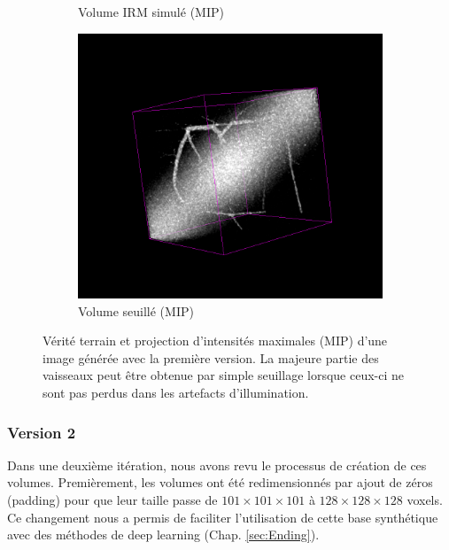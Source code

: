 \begin{figure}[!ht]
\begin{subfigure}{0.45\textwidth}
    \caption{Volume IRM simulé (MIP)}
  \end{subfigure}
  \begin{subfigure}{0.45\textwidth}
    \includegraphics[width=\textwidth]{Images/vascu_v1_thresholding.png}
    \centering
    \caption{Volume seuillé (MIP)}
  \end{subfigure}
  \caption{Vérité terrain et projection d'intensités maximales (MIP) d'une image générée avec la première version. La majeure partie des vaisseaux peut être obtenue par simple seuillage lorsque ceux-ci ne sont pas perdus dans les artefacts d'illumination.}

  \label{fig:vascu_v1_problems}
\end{figure}

\subsubsection{Version 2}

Dans une deuxième itération, nous avons revu le processus de création de ces volumes. Premièrement, les volumes ont été redimensionnés par ajout de zéros (padding) pour que leur taille passe de $101 \times 101 \times 101$ à $128 \times 128 \times 128$ voxels. Ce changement nous a permis de faciliter l'utilisation de cette base synthétique avec des méthodes de deep learning (Chap. \ref{sec:Ending}).

